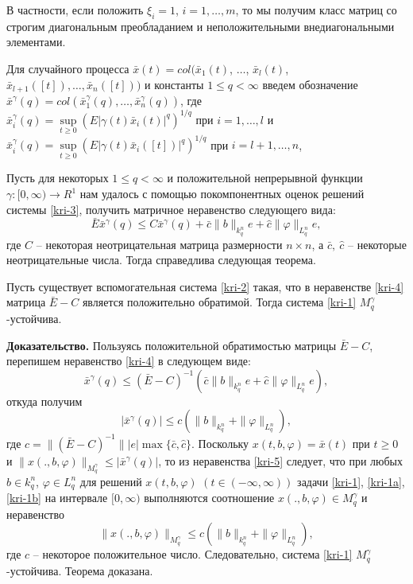 В частности, если положить $\xi _i = 1$, $i = 1,\dots,m$, то мы
получим класс матриц со строгим диагональным преобладанием и
неположительными внедиагональными элементами.

Для случайного процесса $\bar x(t) = col(\bar x_1(t)$, $\dots$, $\bar
x_l(t)$, $\bar x_{l+1}([t]),\dots,\bar x_n([t]))$ и константы $1 \leq q
< \infty $ введем обозначение $ \bar x^\gamma (q) = col (\bar
x_1^\gamma (q),\dots,\bar x_n^\gamma (q))$, где \\$\bar x_i^\gamma (q) =
\sup \limits _{t \geq 0}\left(E|\gamma (t) \bar x_i(t)|^{q}\right)^{1/q}$ при   $i = 1,\dots,l$ и $\bar x_i^\gamma (q) = \sup \limits
_{t \geq 0}\left(E|\gamma (t)\bar x_i([t])|^{q}\right)^{1/q}$ при
$i = l+1,\dots,n$,

Пусть для некоторых $1\le q < \infty $ и положительной непрерывной
функции $\gamma :[0, \infty) \rightarrow R^1 $ нам удалось с помощью
покомпонентных оценок решений системы \eqref{kri-3}, получить матричное
неравенство следующего вида:
\begin{equation}\label{kri-4}
\bar E\bar x^\gamma (q) \leq C\bar x^\gamma (q) + \bar
c\|b\|_{k^n_{q}}e + \hat c \|\varphi \|_{L^n_q} e,
\end{equation}
где $C$ -- некоторая неотрицательная матрица размерности $n\times
n$, а $\bar c, \ \hat c$ -- некоторые неотрицательные числа. Тогда
справедлива следующая теорема.

\begin{theorem}\label{kri-th2} Пусть существует вспомогательная система
\eqref{kri-2} такая, что в неравенстве \eqref{kri-4} матрица $\bar E - C$ является
положительно обратимой. Тогда система \eqref{kri-1} $M_q^\gamma$-устой\-чи\-ва.
\end{theorem}

\textbf{ Доказательство.} Пользуясь положительной обратимостью матрицы
$\bar E - C$, перепишем неравенство \eqref{kri-4} в следующем виде:
$$
\bar x^\gamma (q) \leq (\bar E - C)^{-1}\left(\bar c\|b\|_{k^n_{q}}e
+ \hat c \|\varphi \|_{L^n_q} e \right),
$$
откуда получим
\begin{equation}\label{kri-5}
|\bar x^\gamma (q)| \leq c\left(\|b\|_{k^n_{q}}+ \|\varphi
\|_{L^n_q}\right),
\end{equation}
где $c =\|(\bar E - C)^{-1}\||e|\max \{\bar c, \hat c\}$.
Поскольку $x(t,b,\varphi) = \bar x(t)$  при $t \geq 0$ и
$\|x(.,b,\varphi)\|_{M_q^\gamma} \leq |\bar x^\gamma (q)|$, то из
неравенства \eqref{kri-5} следует, что при любых $b \in k^n_q$, $\varphi \in
L^n_q$ для решений $x(t, b, \varphi)$ $(t \in (-\infty, \infty))$
задачи \eqref{kri-1}, \eqref{kri-1a}, \eqref{kri-1b} на интервале $[0,\infty)$ выполняются
соотношение $x(., b, \varphi) \in M_q^\gamma$ и неравенство
$$
\|x(., b, \varphi)\|_{M_q^\gamma} \le c(\|b\|_{k^n_q} + \|\varphi
\|_{L^n_q}),
$$
где $c$ -- некоторое положительное число. Следовательно,  система
\eqref{kri-1} $M_q^\gamma$-устойчива. Теорема доказана.

